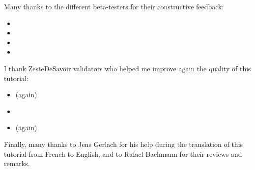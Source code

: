 \begin{Information}
  Many thanks to the different beta-testers for their constructive
  feedback:

\begin{itemize}
\item {}
\item {}
\item {}
\item {}
\end{itemize}
  I thank ZesteDeSavoir validators who helped me improve again the quality of
  this tutorial:

\begin{itemize}
\item {} (again)
\item {}
\item {} (again)
\end{itemize}
  Finally, many thanks to Jens Gerlach for his help during the translation of
  this tutorial from French to English, and to Rafael Bachmann for their reviews
  and remarks.
\end{Information}
